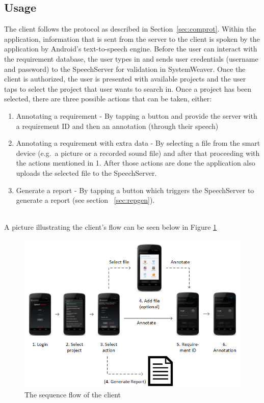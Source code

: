 \subsection{Usage}
\label{subsec:usage}
The client follows the protocol as described in Section~\ref{sec:comprot}. Within the application, information that is sent from the server to the client is spoken by the application by Android's text-to-speech engine. Before the user can interact with the requirement database, the user types in and sends user credentials (username and password) to the SpeechServer for validation in SystemWeaver. Once the client is authorized, the user is presented with available projects and the user taps to select the project that user wants to search in. Once a project has been selected, there are three possible actions that can be taken, either: 
\begin{enumerate}
\item Annotating a requirement - By tapping a button and provide the server with a requirement ID and then an annotation (through their speech)
\item Annotating a requirement with extra data - By selecting a file from the smart device (e.g.\ a picture or a recorded sound file) and after that proceeding with the actions mentioned in 1. After those actions are done the application also uploads the selected file to the SpeechServer.
\item Generate a report - By tapping a button which triggers the SpeechServer to generate a report (see section ~\ref{sec:repgen}).
\end{enumerate}
\\
A picture illustrating the client's flow can be seen below in Figure \ref{fig:clientflow}

\begin{figure}[h]
\centering
\includegraphics[width = 400pt, keepaspectratio = true]{fig/ClientFLOWupdated}
\caption{The sequence flow of the client}
\label{fig:clientflow}
\end{figure}
\FloatBarrier

